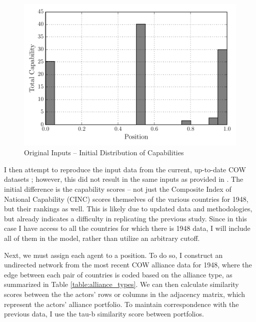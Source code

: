 \begin{figure}
  \centering
  \includegraphics[scale=0.75]{ColdWar/Figures/Original_Inputs_hist}
  \caption[Original Inputs]{Original Inputs -- Initial Distribution of Capabilities}
  \label{fig:original_input_hist}
  \figSpace
 \end{figure}



I then attempt to reproduce the input data from the current, up-to-date COW datasets \citep{gibler_2009,grieg_2010}; however, this did not result in the same inputs as provided in \citet{bdm_1998}. The initial difference is the capability scores -- not just the Composite Index of National Capability (CINC) scores themselves of the various countries for 1948, but their rankings as well. This is likely due to updated data and methodologies, but already indicates a difficulty in replicating the previous study. Since in this case I have access to all the countries for which there is 1948 data, I will include all of them in the model, rather than utilize an arbitrary cutoff.

Next, we must assign each agent to a position. To do so, I construct an undirected network from the most recent COW alliance data for 1948, where the edge between each pair of countries is coded based on the alliance type, as summarized in Table \ref{table:alliance_types}. We can then calculate similarity scores between the the actors' rows or columns in the adjacency matrix, which represent the actors' alliance portfolio. To maintain correspondence with the previous data, I use the tau-b similarity score between portfolios. 

